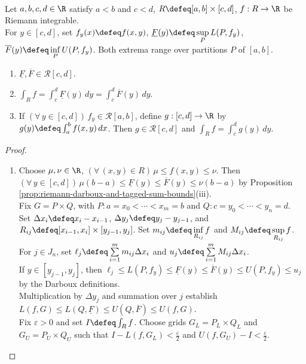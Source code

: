 \begin{theorem} \label{thm:fubini-riemann-rectangle-slices} \\
Let $a,b,c,d\in\R$ satisfy $a<b$ and $c<d$, $R\defeq[a,b]\times[c,d]$, $f:R\to\R$ be Riemann integrable.\\
For $y\in[c,d]$, set $f_y(x)\defeq f(x,y)$, $\underline F(y)\defeq\sup\limits_P L(P,f_y)$, $\overline F(y)\defeq\inf\limits_P U(P,f_y)$. Both extrema range over partitions $P$ of $[a,b]$.
\begin{enumerate}[label=(\roman*)]
\setlength{\itemsep}{0pt}
\item $\underline F,\overline F\in\mathcal R[c,d]$.
\item $\int_R f=\int_c^d\underline F(y)\,dy=\int_c^d\overline F(y)\,dy$.
\item If $(\forall\,y\in[c,d])\,f_y\in\mathcal R[a,b]$, define $g:[c,d]\to\R$ by $g(y)\defeq\int_a^b f(x,y)\,dx$. Then $g\in\mathcal R[c,d]$ and $\int_R f=\int_c^d g(y)\,dy$.
\end{enumerate}
\begin{proof}
\begin{enumerate}[label=(\roman*)]
\setlength{\itemsep}{0pt}
\item Choose $\mu,\nu\in\R$, $(\forall\,(x,y)\in R)\,\mu\leq f(x,y)\leq\nu$. Then $(\forall\,y\in[c,d])\,\mu(b-a)\leq\underline F(y)\leq\overline F(y)\leq\nu(b-a)$ by Proposition \ref{prop:riemann-darboux-and-tagged-sum-bounds}(iii).\\
Fix $G=P\times Q$, with $P:a=x_0<\cdots<x_m=b$ and $Q:c=y_0<\cdots<y_n=d$.\\
Set $\Delta x_i\defeq x_i-x_{i-1}$, $\Delta y_j\defeq y_j-y_{j-1}$, and $R_{ij}\defeq[x_{i-1},x_i]\times[y_{j-1},y_j]$. Set $m_{ij}\defeq\inf\limits_{R_{ij}}f$ and $M_{ij}\defeq\sup\limits_{R_{ij}}f$.\\
For $j\in J_n$, set $\ell_j\defeq\sum\limits_{i=1}^{m}m_{ij}\Delta x_i$ and $u_j\defeq\sum\limits_{i=1}^{m}M_{ij}\Delta x_i$.\\
If $y\in[y_{j-1},y_j]$, then $\ell_j\leq L(P,f_y)\leq\underline F(y)\leq\overline F(y)\leq U(P,f_y)\leq u_j$ by the Darboux definitions.\\
Multiplication by $\Delta y_j$ and summation over $j$ establish $L(f,G)\leq L(Q,\underline F)\leq U(Q,\overline F)\leq U(f,G)$.\\
Fix $\varepsilon>0$ and set $I\defeq\int_R f$. Choose grids $G_L=P_L\times Q_L$ and $G_U=P_U\times Q_U$ such that $I-L(f,G_L)<\frac{\varepsilon}{2}$ and $U(f,G_U)-I<\frac{\varepsilon}{2}$.\\

\end{enumerate}
\end{proof}
\end{theorem}

